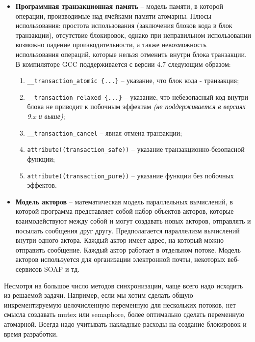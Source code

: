 \begin{itemize}
    \item\textbf{Программная транзакционная память} -- модель памяти, в которой операции, производимые над ячейками памяти атомарны. Плюсы использования: простота использования (заключения блоков кода в блок транзакции), отсутствие блокировок, однако при неправильном использовании возможно падение производительности, а также невозможность использования операций, которые нельзя отменить внутри блока транзакции. В компиляторе GCC поддерживается с версии 4.7 следующим образом: 
    \begin{enumerate}
        \item\texttt{\_\_transaction\_atomic \{...\}} -- указание, что блок кода - транзакция;
        \item\texttt{\_\_transaction\_relaxed \{...\}} -- указание, что небезопасный код внутри блока не приводит к побочным эффектам \textit{(не поддерживается в версиях 9.x и выше)};
        \item\texttt{\_\_transaction\_cancel} -- явная отмена транзакции;
        \item\texttt{attribute((transaction\_safe))} -- указание тран\-зак\-ци\-он\-но-бе\-зо\-пас\-ной функции;
        \item\texttt{attribute((transaction\_pure))} -- указание функции без побочных эффектов.
    \end{enumerate}

    \item\textbf{Модель акторов} -- математическая модель параллельных вычислений, в которой программа представляет собой набор объектов-акторов, которые взаимодействуют между собой и могут создавать новых акторов, отправлять и посылать сообщения друг другу. Предполагается параллелизм вычислений внутри одного актора. Каждый актор имеет адрес, на который можно отправить сообщение. Каждый актор работает в отдельном потоке. Модель акторов используется для организации электронной почты, некоторых веб-сервисов SOAP и тд.
\end{itemize}

Несмотря на большое число методов синхронизации, чаще всего надо исходить из решаемой задачи. Например, если мы хотим сделать общую инкрементируемую целочисленную переменную для нескольких потоков, нет смысла создавать mutex или semaphore, более оптимально сделать переменную атомарной. Всегда надо учитывать накладные расходы на создание блокировок и время разработки.
